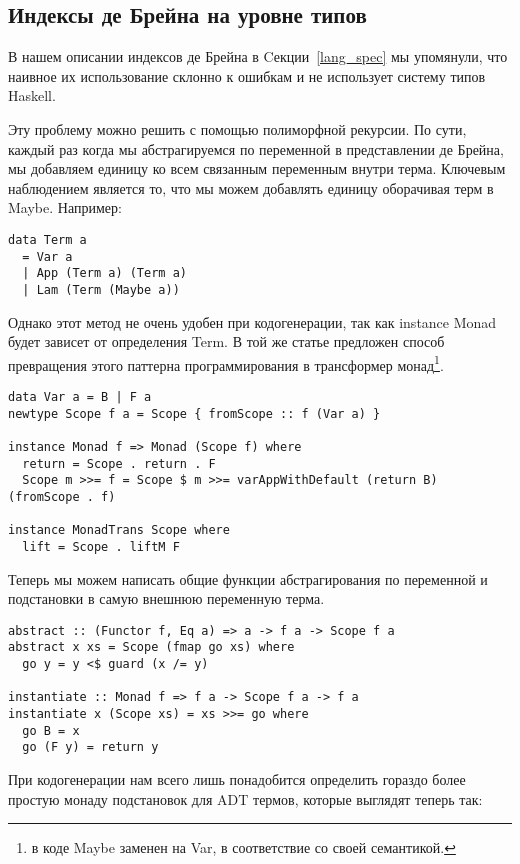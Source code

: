\subsection{Индексы де Брейна на уровне типов}\label{de_brujin_impl}
В нашем описании индексов де Брейна в Cекции~\ref{lang_spec} мы упомянули, что наивное их использование склонно к ошибкам и не использует систему типов Haskell.

Эту проблему можно решить с помощью полиморфной рекурсии\cite{Bird:Pat}. По сути, каждый раз когда мы абстрагируемся по переменной в представлении де Брейна, мы добавляем единицу ко всем связанным переменным внутри терма. Ключевым наблюдением является то, что мы можем добавлять единицу оборачивая терм в Maybe. Например:

\begin{lstlisting}
data Term a
  = Var a
  | App (Term a) (Term a)
  | Lam (Term (Maybe a))
\end{lstlisting}

Однако этот метод не очень удобен при кодогенерации, так как instance Monad будет зависет от определения Term. В той же статье предложен способ превращения этого паттерна программирования в трансформер монад\footnote{в коде Maybe заменен на Var, в соответствие со своей семантикой.}.

\begin{lstlisting}
data Var a = B | F a
newtype Scope f a = Scope { fromScope :: f (Var a) }

instance Monad f => Monad (Scope f) where
  return = Scope . return . F
  Scope m >>= f = Scope $ m >>= varAppWithDefault (return B) (fromScope . f)

instance MonadTrans Scope where
  lift = Scope . liftM F

\end{lstlisting}

Теперь мы можем написать общие функции абстрагирования по переменной и подстановки в самую внешнюю переменную терма.

\begin{lstlisting}
abstract :: (Functor f, Eq a) => a -> f a -> Scope f a
abstract x xs = Scope (fmap go xs) where
  go y = y <$ guard (x /= y)

instantiate :: Monad f => f a -> Scope f a -> f a
instantiate x (Scope xs) = xs >>= go where
  go B = x
  go (F y) = return y

\end{lstlisting}

При кодогенерации нам всего лишь понадобится определить гораздо более простую монаду подстановок для ADT термов, которые выглядят теперь так:

